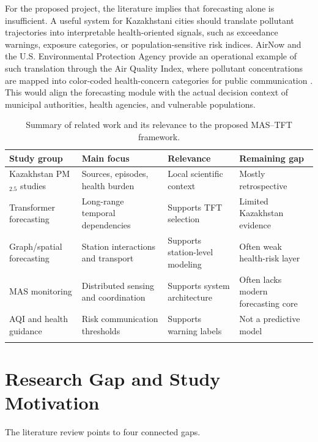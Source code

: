 \documentclass[pdflatex,sn-mathphys-num]{sn-jnl}
\begin{document}
For the proposed project, the literature implies that forecasting alone is insufficient. A useful system for Kazakhstani cities should translate pollutant trajectories into interpretable health-oriented signals, such as exceedance warnings, exposure categories, or population-sensitive risk indices. AirNow and the U.S. Environmental Protection Agency provide an operational example of such translation through the Air Quality Index, where pollutant concentrations are mapped into color-coded health-concern categories for public communication \cite{airnow2026aqi,epa2026breakpoints}. This would align the forecasting module with the actual decision context of municipal authorities, health agencies, and vulnerable populations.

\begin{table}[h]
\caption{Summary of related work and its relevance to the proposed MAS--TFT framework.}\label{tab:related_work}
\begin{tabular}{@{}llll@{}}
\toprule
Study group & Main focus & Relevance & Remaining gap\\
\midrule
Kazakhstan PM$_{2.5}$ studies & Sources, episodes, health burden & Local scientific context & Mostly retrospective\\
Transformer forecasting & Long-range temporal dependencies & Supports TFT selection & Limited Kazakhstan evidence\\
Graph/spatial forecasting & Station interactions and transport & Supports station-level modeling & Often weak health-risk layer\\
MAS monitoring & Distributed sensing and coordination & Supports system architecture & Often lacks modern forecasting core\\
AQI and health guidance & Risk communication thresholds & Supports warning labels & Not a predictive model\\
\botrule
\end{tabular}
\end{table}

\section{Research Gap and Study Motivation}\label{sec:gap}

The literature review points to four connected gaps.
\end{document}
